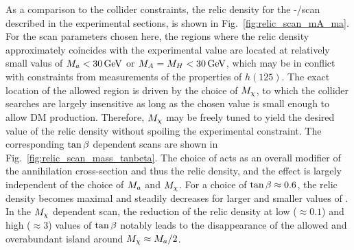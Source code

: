 As a comparison to the collider constraints, the relic density for the \ma-\mA/\mH scan described in the experimental sections, is shown in Fig.~\ref{fig:relic_scan_mA_ma}. For the scan parameters chosen here, the regions where the relic density approximately coincides with the experimental value are located at relatively small valus of $\ma < \unit[30]{GeV}$ or $\mA=\mH < \unit[30]{GeV}$, which may be in conflict with constraints from measurements of the properties of $h(125)$. The exact location of the allowed region is driven by the choice of $M_{\chi}$, to which the collider searches are largely insensitive as long as the chosen value is small enough to allow DM production. Therefore, $M_{\chi}$ may be freely tuned to yield the desired value of the relic density without spoiling the experimental constraint. The corresponding $\tan\beta$ dependent scans are shown in Fig.~\ref{fig:relic_scan_mass_tanbeta}. The choice of \tanb acts as an overall modifier of the annihilation cross-section and thus the relic density, and the effect is largely independent of the choice of $M_{a}$ and $M_{\chi}$. For a choice of $\tan\beta\approx0.6$, the relic density becomes maximal and steadily decreases for larger and smaller values of \tanb. In the $M_{\chi}$ dependent scan, the reduction of the relic density at low ($\approx0.1$) and high ($\approx3$) values of $\tan\beta$ notably leads to the disappearance of the allowed and overabundant island around $M_{\chi}\approx M_{a}/2$.

